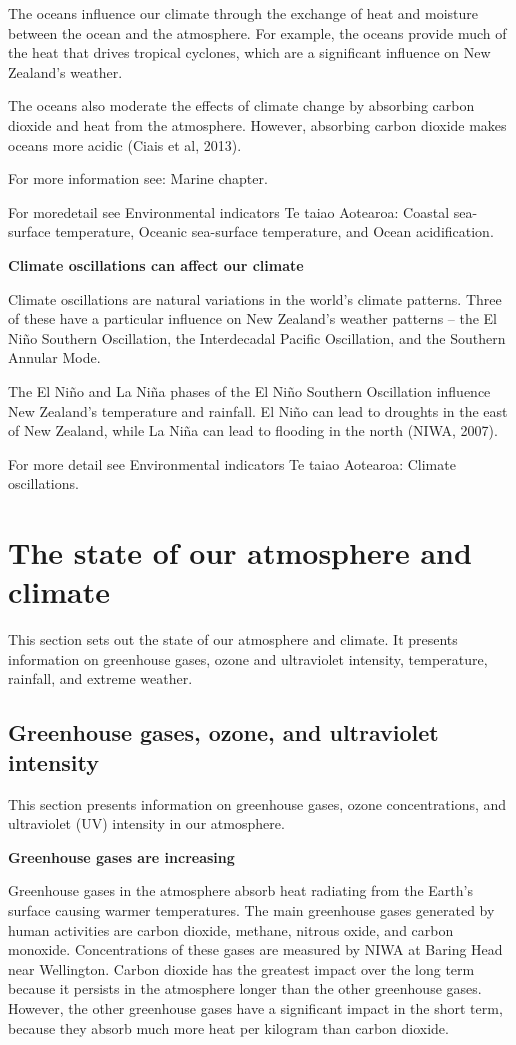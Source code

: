 \documentclass[11pt]{article} %
\begin{document}
The oceans influence our climate through the exchange of heat and moisture between the ocean and the atmosphere. For example, the oceans provide much of the heat that drives tropical cyclones, which are a significant influence on New Zealand’s weather.

The oceans also moderate the effects of climate change by absorbing carbon dioxide and heat from the atmosphere. However, absorbing carbon dioxide makes oceans more acidic (Ciais et al, 2013).

For more information see: Marine chapter.

For moredetail see Environmental indicators Te taiao Aotearoa: Coastal sea-surface temperature, Oceanic sea-surface temperature, and Ocean acidification.

\textbf{Climate oscillations can affect our climate}

Climate oscillations are natural variations in the world’s climate patterns. Three of these have a particular influence on New Zealand’s weather patterns – the El Niño Southern Oscillation, the Interdecadal Pacific Oscillation, and the Southern Annular Mode.

The El Niño and La Niña phases of the El Niño Southern Oscillation influence New Zealand’s temperature and rainfall. El Niño can lead to droughts in the east of New Zealand, while La Niña can lead to flooding in the north (NIWA, 2007).

For more detail see Environmental indicators Te taiao Aotearoa: Climate oscillations.

\section{The state of our atmosphere and climate}

This section sets out the state of our atmosphere and climate. It presents information on greenhouse gases, ozone and ultraviolet intensity, temperature, rainfall, and extreme weather.

\subsection{Greenhouse gases, ozone, and ultraviolet intensity}

This section presents information on greenhouse gases, ozone concentrations, and ultraviolet (UV) intensity in our atmosphere.

\textbf{Greenhouse gases are increasing}

Greenhouse gases in the atmosphere absorb heat radiating from the Earth’s surface causing warmer temperatures. The main greenhouse gases generated by human activities are carbon dioxide, methane, nitrous oxide, and carbon monoxide. Concentrations of these gases are measured by NIWA at Baring Head near Wellington. Carbon dioxide has the greatest impact over the long term because it persists in the atmosphere longer than the other greenhouse gases. However, the other greenhouse gases have a significant impact in the short term, because they absorb much more heat per kilogram than carbon dioxide.
\end{document}

